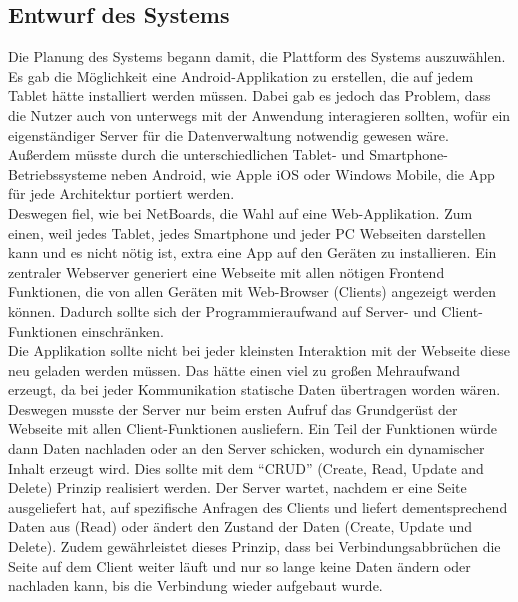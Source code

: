 \subsection{Entwurf des Systems}\label{Entwurf des Systems}
Die Planung des Systems begann damit, die Plattform des Systems auszuwählen.
Es gab die Möglichkeit eine Android-Applikation zu erstellen, die auf jedem Tablet hätte installiert werden müssen.
Dabei gab es jedoch das Problem, dass die Nutzer auch von unterwegs mit der Anwendung interagieren sollten, wofür ein eigenständiger Server für die Datenverwaltung notwendig gewesen wäre.
Außerdem müsste durch die unterschiedlichen Tablet- und Smartphone-Betriebssysteme neben Android, wie Apple iOS oder Windows Mobile, die App für jede Architektur portiert werden.
\\
Deswegen fiel, wie bei NetBoards, die Wahl auf eine Web-Applikation. Zum einen, weil jedes Tablet, jedes Smartphone und jeder PC Webseiten darstellen kann und es nicht nötig ist, extra eine App auf den Geräten zu installieren.
Ein zentraler Webserver generiert eine Webseite mit allen nötigen Frontend Funktionen, die von allen Geräten mit Web-Browser (Clients) angezeigt werden können. Dadurch sollte sich der Programmieraufwand auf Server- und Client-Funktionen einschränken.
\\
Die Applikation sollte nicht bei jeder kleinsten Interaktion mit der Webseite diese neu geladen werden müssen. Das hätte einen viel zu großen Mehraufwand erzeugt, da bei jeder Kommunikation statische Daten übertragen worden wären.
Deswegen musste der Server nur beim ersten Aufruf das Grundgerüst der Webseite mit allen Client-Funktionen ausliefern. Ein Teil der Funktionen würde dann Daten nachladen oder an den Server schicken, wodurch ein dynamischer Inhalt erzeugt wird.
Dies sollte mit dem ``CRUD'' (Create, Read, Update and Delete) Prinzip realisiert werden.
Der Server wartet, nachdem er eine Seite ausgeliefert hat, auf spezifische Anfragen des Clients und liefert dementsprechend Daten aus (Read) oder ändert den Zustand der Daten (Create, Update und Delete). Zudem gewährleistet dieses Prinzip, dass bei Verbindungsabbrüchen die Seite auf dem Client weiter läuft und nur so lange keine Daten ändern oder nachladen kann, bis die Verbindung wieder aufgebaut wurde.
\\
